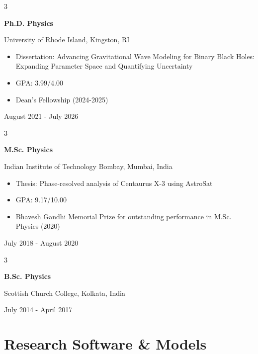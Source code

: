 \documentclass[10pt, letterpaper]{article}
\newenvironment{highlights}{
    \begin{itemize}[
        topsep=0.10 cm,
        parsep=0.10 cm,
        partopsep=0pt,
        itemsep=0pt,
        leftmargin=0.4 cm + 10pt
    ]
}{
    \end{itemize}
}
\newenvironment{threecolentry}[3][]{
    \onecolentry
    \def\thirdColumn{#3}
    \setcolumnwidth{2.5 cm, \fill, 4.5 cm}
    \begin{paracol}{3}
    {\raggedright #2} \switchcolumn
}{
    \switchcolumn \raggedleft \thirdColumn
    \end{paracol}
    \endonecolentry
}
\begin{document}
\begin{threecolentry}{\textbf{Ph.D. Physics}}{
    August 2021 - July 2026
  }
    University of Rhode Island, Kingston, RI
  \begin{highlights}
    \item Dissertation: Advancing Gravitational Wave Modeling for Binary Black Holes:
          Expanding Parameter Space and Quantifying Uncertainty
    \item GPA: 3.99/4.00
    \item Dean's Fellowship (2024-2025)
  \end{highlights}
\end{threecolentry}

\vspace{0.2 cm}

\begin{threecolentry}{\textbf{M.Sc. Physics}}{
    July 2018 - August 2020
  }
    Indian Institute of Technology Bombay, Mumbai, India
  \begin{highlights}
    \item Thesis: Phase-resolved analysis of Centaurus X-3 using AstroSat
    \item GPA: 9.17/10.00
    \item Bhavesh Gandhi Memorial Prize for outstanding performance in 
          M.Sc. Physics (2020)
  \end{highlights}
\end{threecolentry} 

\vspace{0.2 cm}

\begin{threecolentry}{\textbf{B.Sc. Physics}}{
  July 2014 - April 2017
}
  Scottish Church College, Kolkata, India
\end{threecolentry}


\section{Research Software \& Models}
\end{document}
